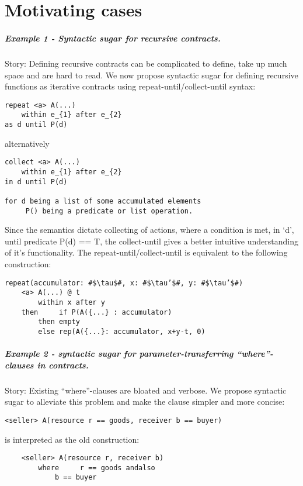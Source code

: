 \documentclass[10pt,a4paper,final,oneside,openany,article]{memoir}
\begin{document}
\appendix

\chapter{Motivating cases}

\paragraph{Example 1 - Syntactic sugar for recursive contracts.}
Story: Defining recursive contracts can be complicated to define, take up much
space and are hard to read. We now propose syntactic sugar for defining
recursive functions as iterative contracts using repeat-until/collect-until
syntax:

\begin{lstlisting}
repeat <a> A(...)
    within e_{1} after e_{2}
as d until P(d)
\end{lstlisting}
alternatively
\begin{lstlisting}
collect <a> A(...)
    within e_{1} after e_{2}
in d until P(d)

for d being a list of some accumulated elements
     P() being a predicate or list operation.
\end{lstlisting}     
Since the semantics dictate collecting of actions, where a condition is met, in
‘d’, until predicate P(d) == T, the collect-until gives a better intuitive
understanding of it’s functionality.
The repeat-until/collect-until is equivalent to the following construction:
\begin{lstlisting}[escapechar=\#]
repeat(accumulator: #$\tau$#, x: #$\tau’$#, y: #$\tau’$#)
    <a> A(...) @ t
        within x after y
    then     if P(A({...} : accumulator)
        then empty
        else rep(A({...}: accumulator, x+y-t, 0)
\end{lstlisting}

\paragraph{Example 2 - syntactic sugar for parameter-transferring “where”-clauses in contracts.}
Story: Existing “where”-clauses are bloated and verbose. We propose syntactic sugar to alleviate this problem and make the clause simpler and more concise:

\begin{lstlisting}
<seller> A(resource r == goods, receiver b == buyer)
\end{lstlisting}
is interpreted as the old construction:
\begin{lstlisting}
    <seller> A(resource r, receiver b)
        where     r == goods andalso
            b == buyer
\end{lstlisting}
\end{document}
